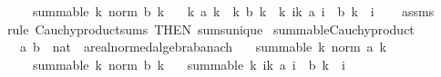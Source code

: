 \begin{isabellebody}
\ \ \ \ \ {\isachardoublequoteopen}summable\ {\isacharparenleft}{\kern0pt}{\isasymlambda}k{\isachardot}{\kern0pt}\ norm\ {\isacharparenleft}{\kern0pt}b\ k{\isacharparenright}{\kern0pt}{\isacharparenright}{\kern0pt}{\isachardoublequoteclose}\isanewline
\ \ \ {\isachardoublequoteopen}{\isacharparenleft}{\kern0pt}{\isasymSum}k{\isachardot}{\kern0pt}\ a\ k{\isacharparenright}{\kern0pt}\ {\isacharasterisk}{\kern0pt}\ {\isacharparenleft}{\kern0pt}{\isasymSum}k{\isachardot}{\kern0pt}\ b\ k{\isacharparenright}{\kern0pt}\ {\isacharequal}{\kern0pt}\ {\isacharparenleft}{\kern0pt}{\isasymSum}k{\isachardot}{\kern0pt}\ {\isasymSum}i{\isasymle}k{\isachardot}{\kern0pt}\ a\ i\ {\isacharasterisk}{\kern0pt}\ b\ {\isacharparenleft}{\kern0pt}k\ {\isacharminus}{\kern0pt}\ i{\isacharparenright}{\kern0pt}{\isacharparenright}{\kern0pt}{\isachardoublequoteclose}\isanewline
%
\isadelimproof
\ \ %
\endisadelimproof
%
\isatagproof
{}\isamarkupfalse%
\ assms\ \isamarkupfalse%
\ {\isacharparenleft}{\kern0pt}rule\ Cauchy{\isacharunderscore}{\kern0pt}product{\isacharunderscore}{\kern0pt}sums\ {\isacharbrackleft}{\kern0pt}THEN\ sums{\isacharunderscore}{\kern0pt}unique{\isacharbrackright}{\kern0pt}{\isacharparenright}{\kern0pt}%
\endisatagproof
{\isafoldproof}%
%
\isadelimproof
\isanewline
%
\endisadelimproof
\isanewline
{}\isamarkupfalse%
\ summable{\isacharunderscore}{\kern0pt}Cauchy{\isacharunderscore}{\kern0pt}product{\isacharcolon}{\kern0pt}\isanewline
\ \ \ a\ b\ {\isacharcolon}{\kern0pt}{\isacharcolon}{\kern0pt}\ {\isachardoublequoteopen}nat\ {\isasymRightarrow}\ {\isacharprime}{\kern0pt}a{\isacharcolon}{\kern0pt}{\isacharcolon}{\kern0pt}{\isacharbraceleft}{\kern0pt}real{\isacharunderscore}{\kern0pt}normed{\isacharunderscore}{\kern0pt}algebra{\isacharcomma}{\kern0pt}banach{\isacharbraceright}{\kern0pt}{\isachardoublequoteclose}\isanewline
\ \ \ {\isachardoublequoteopen}summable\ {\isacharparenleft}{\kern0pt}{\isasymlambda}k{\isachardot}{\kern0pt}\ norm\ {\isacharparenleft}{\kern0pt}a\ k{\isacharparenright}{\kern0pt}{\isacharparenright}{\kern0pt}{\isachardoublequoteclose}\isanewline
\ \ \ \ \ {\isachardoublequoteopen}summable\ {\isacharparenleft}{\kern0pt}{\isasymlambda}k{\isachardot}{\kern0pt}\ norm\ {\isacharparenleft}{\kern0pt}b\ k{\isacharparenright}{\kern0pt}{\isacharparenright}{\kern0pt}{\isachardoublequoteclose}\isanewline
\ \ \ {\isachardoublequoteopen}summable\ {\isacharparenleft}{\kern0pt}{\isasymlambda}k{\isachardot}{\kern0pt}\ {\isasymSum}i{\isasymle}k{\isachardot}{\kern0pt}\ a\ i\ {\isacharasterisk}{\kern0pt}\ b\ {\isacharparenleft}{\kern0pt}k\ {\isacharminus}{\kern0pt}\ i{\isacharparenright}{\kern0pt}{\isacharparenright}{\kern0pt}{\isachardoublequoteclose}\isanewline

\end{isabellebody}
